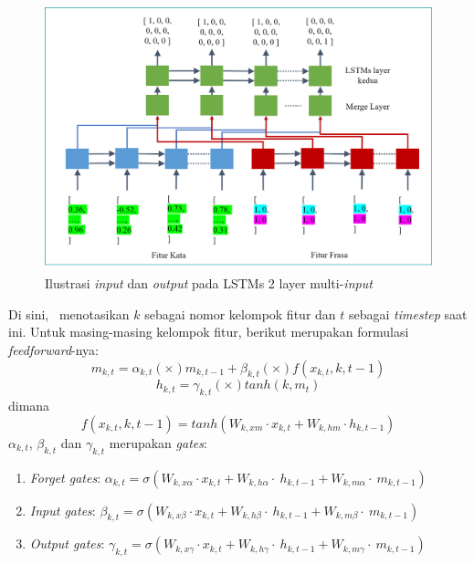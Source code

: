 \begin{enumerate}
	\begin{figure}
		\centering
		\includegraphics[width=1.0\linewidth]{images/iolstm2}
		\caption{Ilustrasi \textit{input} dan \textit{output} pada LSTMs 2 layer multi-\textit{input}}
		\label{fig:iolstm2}
	\end{figure}
	
	Di sini, \saya~menotasikan $ k $ sebagai nomor kelompok fitur dan $ t $ sebagai \textit{timestep} saat ini. Untuk masing-masing kelompok fitur, berikut merupakan formulasi \textit{feedforward}-nya:
	\begin{equation}\label{eq:mt2}
	m_{k,t}=\alpha_{k,t} (\times) m_{k,t-1} + \beta_{k,t} (\times) f(x_{k,t},{k,t-1})
	\end{equation}
	\begin{equation}\label{eq:ht2}
	h_{k,t}=\gamma_{k,t} (\times) tanh(k,m_{t})
	\end{equation}
	dimana
	\begin{equation}\label{eq:hf2}
	f(x_{k,t},{k,t-1})=tanh(W_{k,xm} \cdot x_{k,t} + W_{k,hm} \cdot h_{k,t-1})
	\end{equation}
	$ \alpha_{k,t} $, $ \beta_{k,t} $ dan $ \gamma_{k,t} $ merupakan \textit{gates}:
	\begin{enumerate}
	\item \textit{Forget gates}: $ \alpha_{k,t}=\sigma(W_{k,x\alpha} \cdot x_{k,t}+W_{k,h\alpha}\cdot~h_{k,t-1}+W_{k,m\alpha}\cdot~m_{k,t-1}) $
	\item \textit{Input gates}: $ \beta_{k,t}=\sigma(W_{k,x\beta} \cdot x_{k,t}+W_{k,h\beta}\cdot~h_{k,t-1}+W_{k,m\beta}\cdot~m_{k,t-1}) $
	\item \textit{Output gates}: $ \gamma_{k,t}=\sigma(W_{k,x\gamma} \cdot x_{k,t}+W_{k,h\gamma}\cdot~h_{k,t-1}+W_{k,m\gamma}\cdot~m_{k,t-1}) $
	\end{enumerate}


\end{enumerate}
